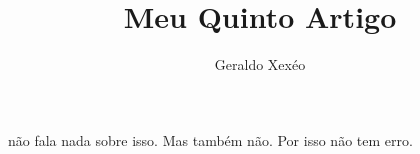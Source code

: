 \documentclass{article}
\title{Meu Quinto Artigo}
\author{Geraldo Xexéo}
\begin{document}
\maketitle
\citet{biber:2012} não fala nada sobre isso. Mas \citep{biber1:2012} também não. Por isso \citep{biber:2012} não tem erro. 
\printbibliography       
\end{document}
